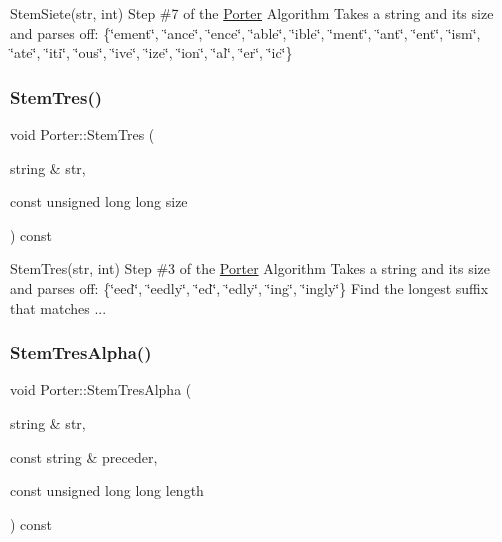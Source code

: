 Stem\+Siete(str, int) Step \#7 of the \hyperlink{classPorter}{Porter} Algorithm Takes a string and its size and parses off\+: \{\char`\"{}ement\char`\"{}, \char`\"{}ance\char`\"{}, \char`\"{}ence\char`\"{}, \char`\"{}able\char`\"{}, \char`\"{}ible\char`\"{}, \char`\"{}ment\char`\"{}, \char`\"{}ant\char`\"{}, \char`\"{}ent\char`\"{}, \char`\"{}ism\char`\"{}, \char`\"{}ate\char`\"{}, \char`\"{}iti\char`\"{}, \char`\"{}ous\char`\"{}, \char`\"{}ive\char`\"{}, \char`\"{}ize\char`\"{}, \char`\"{}ion\char`\"{}, \char`\"{}al\char`\"{}, \char`\"{}er\char`\"{}, \char`\"{}ic\char`\"{}\} \mbox{\label{classPorter_a4aadb1440bc5f143aba28641cab26ff6}} 
\subsubsection{\texorpdfstring{Stem\+Tres()}{StemTres()}}
{\footnotesize\ttfamily void Porter\+::\+Stem\+Tres (\begin{DoxyParamCaption}\item[{string \&}]{str,  }\item[{const unsigned long long}]{size }\end{DoxyParamCaption}) const}

Stem\+Tres(str, int) Step \#3 of the \hyperlink{classPorter}{Porter} Algorithm Takes a string and its size and parses off\+: \{\char`\"{}eed\char`\"{}, \char`\"{}eedly\char`\"{}, \char`\"{}ed\char`\"{}, \char`\"{}edly\char`\"{}, \char`\"{}ing\char`\"{}, \char`\"{}ingly\char`\"{}\} Find the longest suffix that matches ... \mbox{\label{classPorter_ac5e4f3909a27316c6997c92a0019eaaf}} 
\subsubsection{\texorpdfstring{Stem\+Tres\+Alpha()}{StemTresAlpha()}}
{\footnotesize\ttfamily void Porter\+::\+Stem\+Tres\+Alpha (\begin{DoxyParamCaption}\item[{string \&}]{str,  }\item[{const string \&}]{preceder,  }\item[{const unsigned long long}]{length }\end{DoxyParamCaption}) const}

